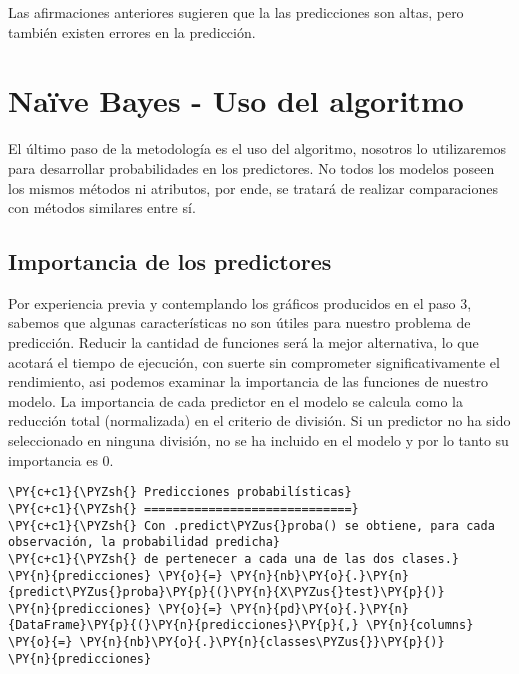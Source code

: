 Las afirmaciones anteriores sugieren que la las predicciones son altas,
pero también existen errores en la predicción.

    \hypertarget{nauxefve-bayes---uso-del-algoritmo}{%
\section{Naïve Bayes - Uso del
algoritmo}\label{nauxefve-bayes---uso-del-algoritmo}}

El último paso de la metodología es el uso del algoritmo, nosotros lo
utilizaremos para desarrollar probabilidades en los predictores. No
todos los modelos poseen los mismos métodos ni atributos, por ende, se
tratará de realizar comparaciones con métodos similares entre sí.

    \hypertarget{importancia-de-los-predictores}{%
\subsection{Importancia de los
predictores}\label{importancia-de-los-predictores}}

Por experiencia previa y contemplando los gráficos producidos en el paso
3, sabemos que algunas características no son útiles para nuestro
problema de predicción. Reducir la cantidad de funciones será la mejor
alternativa, lo que acotará el tiempo de ejecución, con suerte sin
comprometer significativamente el rendimiento, asi podemos examinar la
importancia de las funciones de nuestro modelo. La importancia de cada
predictor en el modelo se calcula como la reducción total (normalizada)
en el criterio de división. Si un predictor no ha sido seleccionado en
ninguna división, no se ha incluido en el modelo y por lo tanto su
importancia es 0.

    \begin{tcolorbox}[breakable, size=fbox, boxrule=1pt, pad at break*=1mm,colback=cellbackground, colframe=cellborder]
\begin{Verbatim}[commandchars=\\\{\}]
\PY{c+c1}{\PYZsh{} Predicciones probabilísticas}
\PY{c+c1}{\PYZsh{} =============================}
\PY{c+c1}{\PYZsh{} Con .predict\PYZus{}proba() se obtiene, para cada observación, la probabilidad predicha}
\PY{c+c1}{\PYZsh{} de pertenecer a cada una de las dos clases.}
\PY{n}{predicciones} \PY{o}{=} \PY{n}{nb}\PY{o}{.}\PY{n}{predict\PYZus{}proba}\PY{p}{(}\PY{n}{X\PYZus{}test}\PY{p}{)}
\PY{n}{predicciones} \PY{o}{=} \PY{n}{pd}\PY{o}{.}\PY{n}{DataFrame}\PY{p}{(}\PY{n}{predicciones}\PY{p}{,} \PY{n}{columns} \PY{o}{=} \PY{n}{nb}\PY{o}{.}\PY{n}{classes\PYZus{}}\PY{p}{)}
\PY{n}{predicciones}
\end{Verbatim}
\end{tcolorbox}

